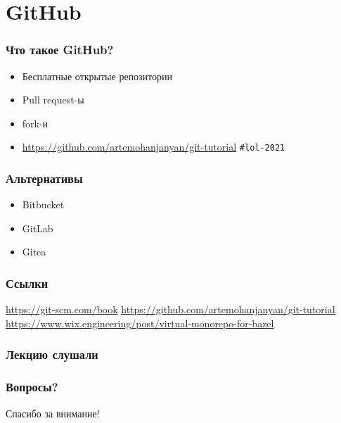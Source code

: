 \documentclass[pdf,russian]{beamer}
\begin{document}
\section{GitHub}

\begin{frame}
    \frametitle{Что такое GitHub?}
    \begin{itemize}
        \pause
        \item Бесплатные открытые репозитории
        \pause
        \item Pull request-ы
        \pause
        \item fork-и
        \pause
        \item \url{https://github.com/artemohanjanyan/git-tutorial}
            \pause\texttt{\#{}lol-2021}
    \end{itemize}
\end{frame}

\begin{frame}
    \frametitle{Альтернативы}
    \begin{itemize}
        \pause
        \item Bitbucket
        \pause
        \item GitLab
        \pause
        \item Gitea
    \end{itemize}
\end{frame}

\begin{frame}
    \frametitle{Ссылки}
    \url{https://git-scm.com/book}
    \url{https://github.com/artemohanjanyan/git-tutorial}
    \url{https://www.wix.engineering/post/virtual-monorepo-for-bazel}
\end{frame}

\begin{frame}
    \frametitle{Лекцию слушали}
    
\end{frame}

\begin{frame}
    \frametitle{Вопросы?}
    \pause
    Спасибо за внимание!
\end{frame}
\end{document}
